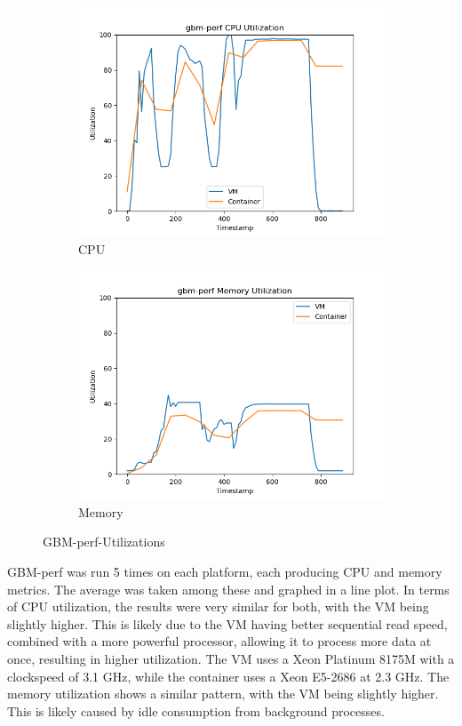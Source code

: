 \documentclass[11pt]{article}
\begin{document}
\begin{figure}[hbt!]
\centering
\begin{subfigure}{.5\textwidth}
  \centering
  \includegraphics[width=1.1\linewidth]{gbmperf_cpu_util.png}
  \caption{CPU}
  \label{fig:gbmperfu1}
\end{subfigure}%
\begin{subfigure}{.5\textwidth}
  \centering
  \includegraphics[width=1.1\linewidth]{gbmperf_mem_util.png}
  \caption{Memory}
  \label{fig:gbmperfu2}
\end{subfigure}
\caption{GBM-perf-Utilizations}
\label{fig:rubis}
\end{figure}

GBM-perf was run 5 times on each platform, each producing CPU and memory metrics. The average was taken among these and graphed in a line plot. In terms of CPU utilization, the results were very similar for both, with the VM being slightly higher. This is likely due to the VM having better sequential read speed, combined with a more powerful processor, allowing it to process more data at once, resulting in higher utilization. The VM uses a Xeon Platinum 8175M with a clockspeed of 3.1 GHz, while the container uses a Xeon E5-2686 at 2.3 GHz. The memory utilization shows a similar pattern, with the VM being slightly higher. This is likely caused by idle consumption from background processes.
\end{document}
